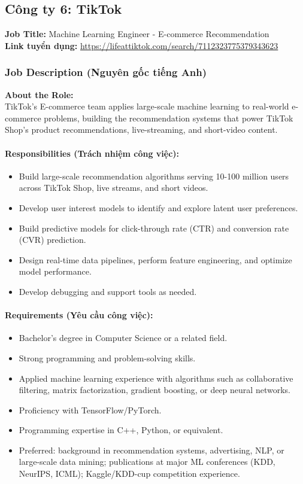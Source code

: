 \subsection{Công ty 6: TikTok}

\noindent\textbf{Job Title:} Machine Learning Engineer - E-commerce Recommendation \\
\textbf{Link tuyển dụng:} \url{https://lifeattiktok.com/search/7112323775379343623}

\subsubsection*{Job Description (Nguyên gốc tiếng Anh)}

\textbf{About the Role:} \\
\indent TikTok's E-commerce team applies large-scale machine learning to real-world e-commerce problems, building the recommendation systems that power TikTok Shop's product recommendations, live-streaming, and short-video content.

\paragraph{Responsibilities (Trách nhiệm công việc):}
\begin{itemize}
    \item Build large-scale recommendation algorithms serving 10-100 million users across TikTok Shop, live streams, and short videos.
    \item Develop user interest models to identify and explore latent user preferences.
    \item Build predictive models for click-through rate (CTR) and conversion rate (CVR) prediction.
    \item Design real-time data pipelines, perform feature engineering, and optimize model performance.
    \item Develop debugging and support tools as needed.
\end{itemize}

\paragraph{Requirements (Yêu cầu công việc):}
\begin{itemize}
    \item Bachelor's degree in Computer Science or a related field.
    \item Strong programming and problem-solving skills.
    \item Applied machine learning experience with algorithms such as collaborative filtering, matrix factorization, gradient boosting, or deep neural networks.
    \item Proficiency with TensorFlow/PyTorch.
    \item Programming expertise in C++, Python, or equivalent.
    \item Preferred: background in recommendation systems, advertising, NLP, or large-scale data mining; publications at major ML conferences (KDD, NeurIPS, ICML); Kaggle/KDD-cup competition experience.
\end{itemize}
